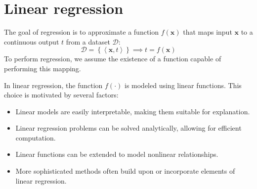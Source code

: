 \section{Linear regression}

The goal of regression is to approximate a function $f(\mathbf{x})$ that maps input $\mathbf{x}$ to a continuous output $t$ from a dataset $\mathcal{D}$: 
\[\mathcal{D}=\left\{ \left\langle \mathbf{x},t \right\rangle \right\} \implies t=f(\mathbf{x})\]
To perform regression, we assume the existence of a function capable of performing this mapping.

In linear regression, the function $f(\cdot)$ is modeled using linear functions. 
This choice is motivated by several factors:
\begin{itemize}
    \item Linear models are easily interpretable, making them suitable for explanation.
    \item Linear regression problems can be solved analytically, allowing for efficient computation.
    \item Linear functions can be extended to model nonlinear relationships.
    \item More sophisticated methods often build upon or incorporate elements of linear regression.
\end{itemize}

